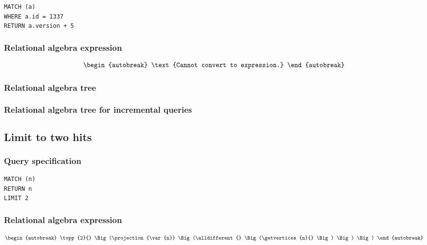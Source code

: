 \begin{lstlisting}
MATCH (a)
WHERE a.id = 1337
RETURN a.version + 5
\end{lstlisting}

\subsubsection*{Relational algebra expression}

\begin{align*}
\begin{autobreak}
\text{Cannot convert to expression.}
\end{autobreak}
\end{align*}

\subsubsection*{Relational algebra tree}


\subsubsection*{Relational algebra tree for incremental queries}


\subsection{Limit to two hits}

\subsubsection*{Query specification}

\begin{lstlisting}
MATCH (n)
RETURN n
LIMIT 2
\end{lstlisting}

\subsubsection*{Relational algebra expression}

\begin{align*}
\begin{autobreak}
\topp{2}{} \Big(\projection{\var{n}} \Big(\alldifferent{} \Big(\getvertices{n}{}
\Big)
\Big)
\Big)
\end{autobreak}
\end{align*}

